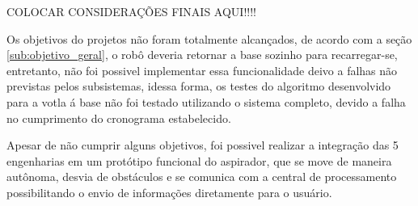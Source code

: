 
COLOCAR CONSIDERAÇÕES FINAIS AQUI!!!!

Os objetivos do projetos não foram totalmente alcançados, de acordo com a seção \ref{sub:objetivo_geral}, o robô deveria retornar a base sozinho para recarregar-se, entretanto, não foi possivel implementar essa funcionalidade deivo a falhas não previstas pelos subsistemas, idessa forma, os testes do algoritmo desenvolvido para a votla á base não foi testado utilizando o sistema completo, devido a falha no cumprimento do cronograma estabelecido.

Apesar de não cumprir alguns objetivos, foi possivel realizar a integração das 5 engenharias em um protótipo funcional do aspirador, que se move de maneira autônoma, desvia de obstáculos e se comunica com a central de processamento possibilitando o envio de informações diretamente para o usuário.

